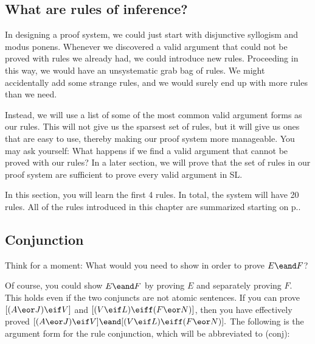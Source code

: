 \subsection{What are rules of inference?}

In designing a proof system, we could just start with disjunctive syllogism and modus ponens. Whenever we discovered a valid argument that could not be proved with rules we already had, we could introduce new rules. Proceeding in this way, we would have an unsystematic grab bag of rules. We might accidentally add some strange rules, and we would surely end up with more rules than we need.

Instead, we will use a list of some of the most common valid argument forms as our rules. This will not give us the sparsest set of rules, but it will give us ones that are easy to use, thereby making our proof system more manageable. You may ask yourself: What happens if we find a valid argument that cannot be proved with our rules? In a later section, we will prove that the set of rules in our proof system are sufficient to prove every valid argument in SL.

In this section, you will learn the first 4 rules. In total, the system will have 20 rules. All of the rules introduced in this chapter are summarized starting on p.\pageref{ProofRules}.

\subsection{Conjunction}

Think for a moment: What would you need to show in order to prove $E \eand F$?

Of course, you could show $E \eand F$ by proving $E$ and separately proving $F$. This holds even if the two conjuncts are not atomic sentences. If you can prove $[(A \eor J) \eif V]$ and  $[(V \eif L) \eiff (F \eor N)]$, then you have effectively proved $[(A \eor J) \eif V] \eand [(V \eif L) \eiff (F \eor N)].$
The following is the argument form for the rule conjunction, which will be abbreviated to (conj):

